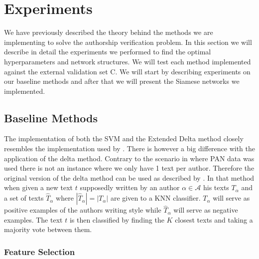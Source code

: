 \section{Experiments} \label{sec:experiments} 

We have previously described the theory behind the methods we are implementing
to solve the authorship verification problem. In this section we will describe
in detail the experiments we performed to find the optimal hyperparameters and
network structures. We will test each method implemented against the external
validation set \gls{C}. We will start by describing experiments on our baseline
methods and after that we will present the Siamese networks we implemented.

\subsection{Baseline Methods} \label{subsec:baseline_methods}

The implementation of both the \gls{SVM} and the Extended Delta method closely
resembles the implementation used by \citet{US}. There is however a big
difference with the application of the delta method. Contrary to the scenario
in \citep{US} where PAN data was used there is not an instance where we only
have 1 text per author. Therefore the original version of the delta method can
be used as described by \citet{evert2015towards}. In that method when given
a new text $t$ supposedly written by an author $\alpha \in \mathcal{A}$ his
texts $T_\alpha$ and a set of texts $\hat{T}_\alpha$ where $|\hat{T}_\alpha|
= |T_\alpha|$ are given to a \gls{KNN} classifier. $T_\alpha$ will serve as
positive examples of the authors writing style while $\hat{T}_\alpha$ will serve
as negative examples. The text $t$ is then classified by finding the $K$ closest
texts and taking a majority vote between them.

\subsubsection{Feature Selection}

%
%

